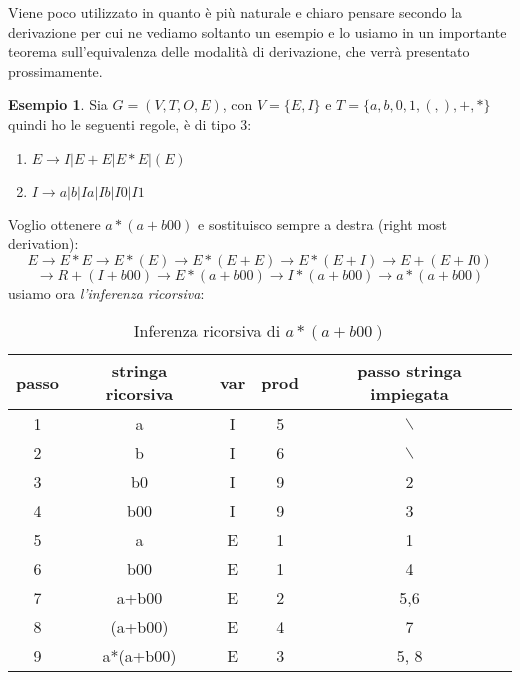 \documentclass[a4paper]{book}
\theoremstyle{definition}%
\newtheorem*{esempio}{Esempio}
\begin{document}
  Viene poco utilizzato in quanto è più naturale e chiaro pensare secondo la derivazione per cui ne vediamo soltanto un esempio
  e lo usiamo in un importante teorema sull'equivalenza delle modalità di derivazione, che verrà presentato prossimamente.
  \begin{esempio}
    Sia $G=(V,T,O,E)$, con $V=\{E,I\}$ e $T=\{a,b,0,1,(,),+,*\}$
    quindi ho le seguenti regole, è di tipo 3:
    \begin{enumerate}
    \item $E\to I | E+E | E*E | (E)$
    \item $I\to a | b | Ia | Ib | I0 | I1$
    \end{enumerate}
    Voglio ottenere $a*(a+b00)$ e sostituisco sempre a destra (right most derivation):
    \[E\to E*E\to E*(E)\to E*(E+E)\to E*(E+I)\to E+(E+I0)\]
    \[\to R+(I+b00)\to E*(a+b00)\to I*(a+b00)\to a*(a+b00)\]
    usiamo ora \textit{l'inferenza ricorsiva}:
    \begin{table}
      \centering
    \caption{Inferenza ricorsiva di $a*(a+b00)$}
      \begin{tabular}{|c|c|c|c|c|}
        \toprule passo & stringa ricorsiva & var & prod & passo stringa impiegata\\
        \midrule 1 & a & I & 5 & $\backslash$ \\
        \hline
        2 & b & I & 6 & $\backslash$ \\
        \hline
        3 & b0 & I & 9 & 2\\
        \hline
        4 & b00 & I & 9 & 3\\
        \hline
        5 & a & E & 1 & 1 \\
        \hline
        6 & b00 & E & 1 & 4\\
        \hline
        7 & a+b00 & E & 2 & 5,6\\
        \hline
        8 & (a+b00) & E & 4 & 7\\
        \hline
        9 &a*(a+b00) & E & 3 & 5, 8\\
        \hline
      \end{tabular}
    \end{table}
  \end{esempio}

\end{document}
